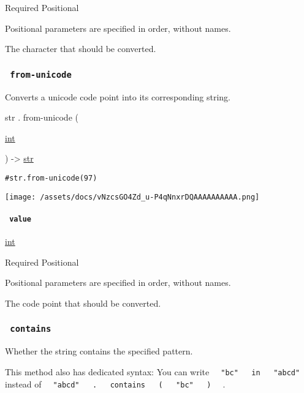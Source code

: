 {Required} {{ Positional }}

\label{definitions-to-unicode-character-positional-tooltip}
Positional parameters are specified in order, without names.

The character that should be converted.

\subsubsection{\texorpdfstring{\texttt{\ from-unicode\ }}{ from-unicode }}\label{definitions-from-unicode}

Converts a unicode code point into its corresponding string.

str { . } { from-unicode } (

{ \href{/docs/reference/foundations/int/}{int} }

) -\textgreater{} \href{/docs/reference/foundations/str/}{str}

\begin{verbatim}
#str.from-unicode(97)
\end{verbatim}

\texttt{[image: /assets/docs/vNzcsGO4Zd\_u-P4qNnxrDQAAAAAAAAAA.png]}

\paragraph{\texorpdfstring{\texttt{\ value\ }}{ value }}\label{definitions-from-unicode-value}

\href{/docs/reference/foundations/int/}{int}

{Required} {{ Positional }}

\label{definitions-from-unicode-value-positional-tooltip}
Positional parameters are specified in order, without names.

The code point that should be converted.

\subsubsection{\texorpdfstring{\texttt{\ contains\ }}{ contains }}\label{definitions-contains}

Whether the string contains the specified pattern.

This method also has dedicated syntax: You can write
\texttt{\ }{\texttt{\ "bc"\ }}\texttt{\ }{\texttt{\ in\ }}\texttt{\ }{\texttt{\ "abcd"\ }}\texttt{\ }
instead of
\texttt{\ }{\texttt{\ "abcd"\ }}\texttt{\ }{\texttt{\ .\ }}\texttt{\ }{\texttt{\ contains\ }}\texttt{\ }{\texttt{\ (\ }}\texttt{\ }{\texttt{\ "bc"\ }}\texttt{\ }{\texttt{\ )\ }}\texttt{\ }
.

